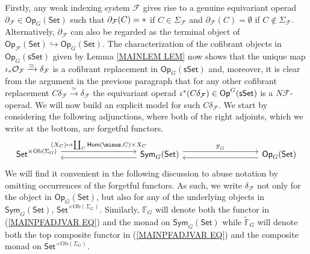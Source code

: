 \documentclass[a4paper,10pt]{article}%
\begin{document}
Firstly, any weak indexing system $\mathcal{F}$
gives rise to a genuine equivariant operad
$\partial_{\mathcal{F}}
\in \mathsf{Op}_G(\mathsf{Set})
$
such that
$\partial_{\mathcal{F}}(C) = \**$
if $C \in \Sigma_{\mathcal{F}}$
and 
$\partial_{\mathcal{F}}(C) = \emptyset$
if $C \nin \Sigma_{\mathcal{F}}$.
Alternatively,  
$\partial_{\mathcal{F}}$
can also be regarded as the terminal object of
$\mathsf{Op}_{\mathcal{F}}(\mathsf{Set})
	\hookrightarrow 
\mathsf{Op}_{G}(\mathsf{Set})$.
The characterization of the cofibrant objects
in $\mathsf{Op}_{G}(\mathsf{sSet})$
given by Lemma \ref{MAINLEM LEM}
now shows that the unique map
$\iota_{\**} \mathcal{O}_{\mathcal{F}} 
\xrightarrow{\simeq} \delta_{\mathcal{F}}$
is a cofibrant replacement in
$\mathsf{Op}_G(\mathsf{sSet})$ and, moreover,
it is clear from the argument 
in the previous paragraph that for any
other cofibrant replacement 
$C \delta_{\mathcal{F}} 
\xrightarrow{\simeq} \delta_{\mathcal{F}}$
the equivariant operad
$\iota^{\**} (C \delta_{\mathcal{F}})
\in \mathsf{Op}^G (\mathsf{sSet})$
is a $N \mathcal{F}$-operad.
We will now build an explicit model for such
$C \delta_{\mathcal{F}}$.
We start by considering the following
adjunctions, where both of the right adjoints, which we write at the bottom, are forgetful functors.
\begin{equation}\label{MAINPFADJVAR EQ}
\begin{tikzcd}[column sep =9em]
	\mathsf{Set}^{\times \text{Ob}(\Sigma_G)}
	\ar[shift left=1.5]{r}
	{(X_C) \mapsto
	\coprod_C \mathsf{Hom}(\minus,C) \times X_C}
&
	\mathsf{Sym}_{G}(\mathsf{Set}) 
	\arrow[l, shift left=1.5] 
	\arrow[r, shift left=1.5,swap,"\mathbb{F}_G"']
&
	\mathsf{Op}_G(\mathsf{Set})
	\ar[shift left=1.5]{l}
\end{tikzcd}
\end{equation}
We will find it convenient in the following discussion to abuse notation by omitting
occurrences of the forgetful functors.
As such, we write
$\delta_{\mathcal{F}}$ not only for the object in 
$\mathsf{Op}_G(\mathsf{Set})$,
but also for any of the underlying objects in 
$\mathsf{Sym}_G(\mathsf{Set})$, 
$\mathsf{Set}^{\times \text{Ob}(\Sigma_G)}$.
Similarly, $\mathbb{F}_G$
will denote both the functor in 
(\ref{MAINPFADJVAR EQ})
and the monad on 
$\mathsf{Sym}_{G}(\mathsf{Set})$
while 
$\widetilde{\mathbb{F}}_G$
will denote both the top composite functor in 
(\ref{MAINPFADJVAR EQ})
and the composite monad on 
$\mathsf{Set}^{\times \text{Ob}(\Sigma_G)}$.
\end{document}
